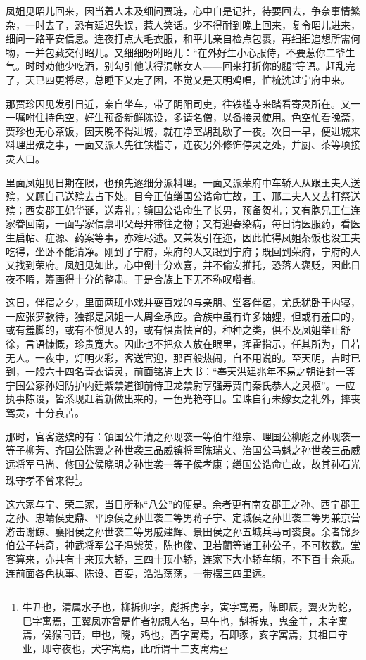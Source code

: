 \documentclass[12pt,oneside]{book}
\begin{document}
凤姐见昭儿回来，因当着人未及细问贾琏，心中自是记挂，待要回去，争奈事情繁杂，一时去了，恐有延迟失误，惹人笑话。少不得耐到晚上回来，复令昭儿进来，细问一路平安信息。连夜打点大毛衣服，和平儿亲自检点包裹，再细细追想所需何物，一并包藏交付昭儿。又细细吩咐昭儿：“在外好生小心服侍，不要惹你二爷生气。时时劝他少吃酒，别勾引他认得混帐女人——回来打折你的腿”等语。赶乱完了，天已四更将尽，总睡下又走了困，不觉又是天明鸡唱，忙梳洗过宁府中来。

那贾珍因见发引日近，亲自坐车，带了阴阳司吏，往铁槛寺来踏看寄灵所在。又一一嘱咐住持色空，好生预备新鲜陈设，多请名僧，以备接灵使用。色空忙看晚斋，贾珍也无心茶饭，因天晚不得进城，就在净室胡乱歇了一夜。次日一早，便进城来料理出殡之事，一面又派人先往铁槛寺，连夜另外修饰停灵之处，并厨、茶等项接灵人口。

里面凤姐见日期在限，也预先逐细分派料理。一面又派荣府中车轿人从跟王夫人送殡，又顾自己送殡去占下处。目今正值缮国公诰命亡故，王、邢二夫人又去打祭送殡；西安郡王妃华诞，送寿礼；镇国公诰命生了长男，预备贺礼；又有胞兄王仁连家眷回南，一面写家信禀叩父母并带往之物；又有迎春染病，每日请医服药，看医生启帖、症源、药案等事，亦难尽述。又兼发引在迩，因此忙得凤姐茶饭也没工夫吃得，坐卧不能清净。刚到了宁府，荣府的人又跟到宁府；既回到荣府，宁府的人又找到荣府。凤姐见如此，心中倒十分欢喜，并不偷安推托，恐落人褒贬，因此日夜不暇，筹画得十分的整肃。于是合族上下无不称叹囋者。

这日，伴宿之夕，里面两班小戏并耍百戏的与亲朋、堂客伴宿，尤氏犹卧于内寝，一应张罗款待，独都是凤姐一人周全承应。合族中虽有许多妯娌，但或有羞口的，或有羞脚的，或有不惯见人的，或有惧贵怯官的，种种之类，俱不及凤姐举止舒徐，言语慷慨，珍贵宽大。因此也不把众人放在眼里，挥霍指示，任其所为，目若无人。一夜中，灯明火彩，客送官迎，那百般热闹，自不用说的。至天明，吉时已到，一般六十四名青衣请灵，前面铭旌上大书：“奉天洪建兆年不易之朝诰封一等宁国公冢孙妇防护内廷紫禁道御前侍卫龙禁尉享强寿贾门秦氏恭人之灵柩”。一应执事陈设，皆系现赶着新做出来的，一色光艳夺目。宝珠自行未嫁女之礼外，摔丧驾灵，十分哀苦。

那时，官客送殡的有：镇国公牛清之孙现袭一等伯牛继宗、理国公柳彪之孙现袭一等子柳芳、齐国公陈翼之孙世袭三品威镇将军陈瑞文、治国公马魁之孙世袭三品威远将军马尚、修国公侯晓明之孙世袭一等子侯孝康；缮国公诰命亡故，故其孙石光珠守孝不曾来得\footnote{牛丑也，清属水子也，柳拆卯字，彪拆虎字，寅字寓焉，陈即辰，翼火为蛇，巳字寓焉，王翼凤亦曾是作者初想人名，马午也，魁拆鬼，鬼金羊，未字寓焉，侯猴同音，申也，晓，鸡也，酉字寓焉，石即豕，亥字寓焉，其祖曰守业，即守夜也，犬字寓焉，此所谓十二支寓焉}。

这六家与宁、荣二家，当日所称“八公”的便是。余者更有南安郡王之孙、西宁郡王之孙、忠靖侯史鼎、平原侯之孙世袭二等男蒋子宁、定城侯之孙世袭二等男兼京营游击谢鲸、襄阳侯之孙世袭二等男戚建辉、景田侯之孙五城兵马司裘良。余者锦乡伯公子韩奇，神武将军公子冯紫英，陈也俊、卫若蘭等诸王孙公子，不可枚数。堂客算来，亦共有十来顶大轿，三四十顶小轿，连家下大小轿车辆，不下百十余乘。连前面各色执事、陈设、百耍，浩浩荡荡，一带摆三四里远。
\end{document}
